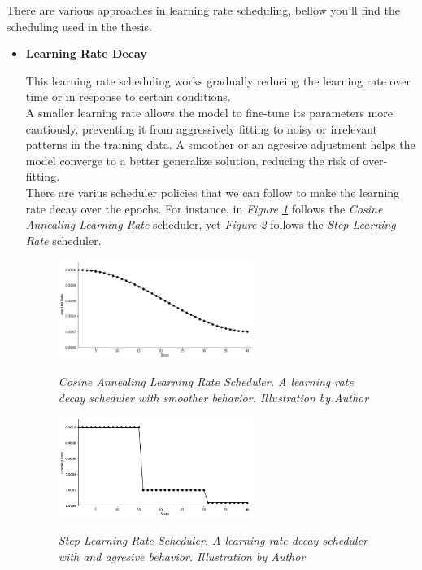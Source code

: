 There are various approaches in learning rate scheduling, bellow you'll find the scheduling used in the thesis.

\begin{itemize}
    \item \textbf{Learning Rate Decay}

    This learning rate scheduling works gradually reducing
    the learning rate over time or in response to certain conditions. \\

    A smaller learning rate allows the model to fine-tune its parameters more cautiously,
    preventing it from aggressively fitting to noisy or irrelevant patterns in the training data.
    A smoother or an agresive adjustment helps the model converge to a better generalize solution,
    reducing the risk of over-fitting. \\

    There are varius scheduler policies that we can follow to make the learning rate decay over
    the epochs. For instance, in \textit{Figure \ref{fig:learning-rate-decay-cosine-annealing}} follows the \textit{Cosine Annealing Learning Rate} scheduler, yet
    \textit{Figure \ref{fig:learning-rate-decay-step}} follows the \textit{Step Learning Rate} scheduler.

    \begin{figure}[H]
    \centering
    \includegraphics[width=0.6\textwidth]{imatges/preliminaries/cosinus-scheduler.png}
    \caption[Cosine Annealing Learning Rate Scheduler]{\textit{Cosine Annealing Learning Rate Scheduler. A learning rate decay scheduler with smoother behavior.
      Illustration by Author}}
    {\label{fig:learning-rate-decay-cosine-annealing}}
    \end{figure}

    \begin{figure}[H]
    \centering
    \includegraphics[width=0.6\textwidth]{imatges/preliminaries/step-scheduler.png}
    \caption[Step Learning Rate Scheduler]{\textit{Step Learning Rate Scheduler. A learning rate decay scheduler with
      and agresive behavior. Illustration by Author}}
    {\label{fig:learning-rate-decay-step}}
    \end{figure}


\end{itemize}
